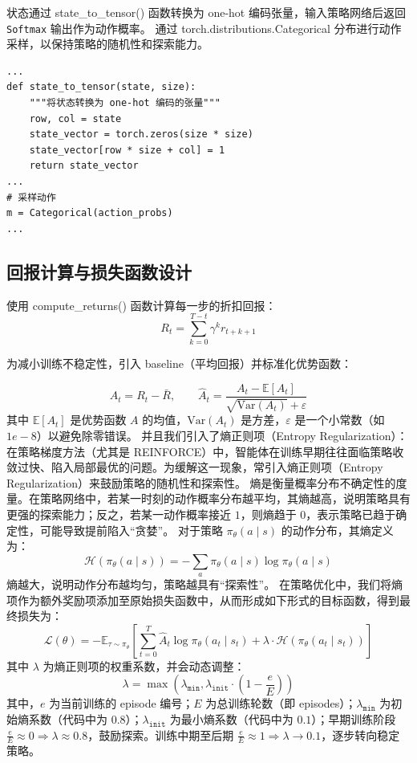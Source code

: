 状态通过 \textsf{state\_to\_tensor()} 函数转换为 one-hot 编码张量，输入策略网络后返回 \texttt{Softmax} 输出作为动作概率。
通过 \textsf{torch.distributions.Categorical} 分布进行动作采样，以保持策略的随机性和探索能力。

\begin{verbatim}
...
def state_to_tensor(state, size):
    """将状态转换为 one-hot 编码的张量"""
    row, col = state
    state_vector = torch.zeros(size * size)
    state_vector[row * size + col] = 1
    return state_vector
...
# 采样动作
m = Categorical(action_probs)
...
\end{verbatim}

\subsection{回报计算与损失函数设计}

使用 \textsf{compute\_returns()} 函数计算每一步的折扣回报：
\[
    R_t = \sum_{k=0}^{T-t} \gamma^k r_{t+k+1}
\]

为减小训练不稳定性，引入 baseline（平均回报）并标准化优势函数：

\[
    A_t = R_t - \bar{R}, \qquad \hat{A}_t = \frac{A_t - \mathbb{E}[A_t]}{\sqrt{\text{Var}(A_t)} + \varepsilon}
\]
其中 \(\mathbb{E}[A_t]\) 是优势函数 \(A\) 的均值，\(\text{Var}(A_t)\) 是方差，\(\varepsilon\) 是一个小常数（如 \(1e-8\)）以避免除零错误。
并且我们引入了熵正则项（Entropy Regularization）：在策略梯度方法（尤其是 REINFORCE）中，智能体在训练早期往往面临策略收敛过快、陷入局部最优的问题。为缓解这一现象，常引入熵正则项（Entropy Regularization）来鼓励策略的随机性和探索性。
熵是衡量概率分布不确定性的度量。在策略网络中，若某一时刻的动作概率分布越平均，其熵越高，说明策略具有更强的探索能力；反之，若某一动作概率接近 \(1\)，则熵趋于 \(0\)，表示策略已趋于确定性，可能导致提前陷入“贪婪”。
对于策略 \( \pi_{\theta} \left( a \mid s \right) \) 的动作分布，其熵定义为：
\begin{equation}
    \mathcal{H} \left( \pi_{\theta} \left( a \mid s \right) \right) = - \sum_a \pi_{\theta} \left( a \mid s \right) \log \pi_{\theta} \left( a \mid s \right)
\end{equation}
熵越大，说明动作分布越均匀，策略越具有“探索性”。
在策略优化中，我们将熵项作为额外奖励项添加至原始损失函数中，从而形成如下形式的目标函数，得到最终损失为：
\begin{equation}
    \mathcal{L} \left( \theta \right) = - \mathbb{E}_{\tau \sim \pi_{\theta}} \left[ \sum_{t=0}^{T} \hat{A}_t \log \pi_{\theta} \left( a_t \mid s_t \right) + \lambda \cdot \mathcal{H} \left( \pi_{\theta} \left( a_t \mid s_t \right) \right) \right]
\end{equation}
其中 \(\lambda\) 为熵正则项的权重系数，并会动态调整：
\[
    \lambda = \max \left( \lambda_{\texttt{min}}, \lambda_{\texttt{init}} \cdot \left( 1 - \frac{e}{E} \right) \right)
\]
其中，\(e\) 为当前训练的 episode 编号；\(E\) 为总训练轮数（即 episodes）；\(\lambda_{\texttt{min}}\) 为初始熵系数（代码中为 \(0.8\)）；\(\lambda_{\texttt{init}}\) 为最小熵系数（代码中为 \(0.1\)）；早期训练阶段 \(\frac{e}{E} \approx 0 \Rightarrow \lambda \approx 0.8\)，鼓励探索。训练中期至后期 \(\frac{e}{E} \approx 1 \Rightarrow \lambda \to 0.1\)，逐步转向稳定策略。

